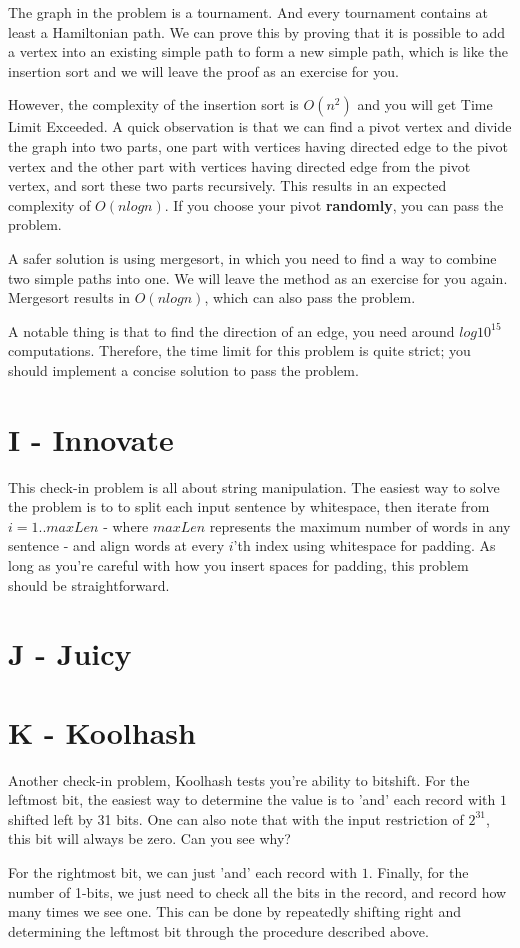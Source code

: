 \documentclass{article}
\begin{document}
The graph in the problem is a tournament. And every tournament contains at least a Hamiltonian path. We can prove this by proving that it is possible to add a vertex into an existing simple path to form a new simple path, which is like the insertion sort and we will leave the proof as an exercise for you.

\par
However, the complexity of the insertion sort is $O(n^2)$ and you will get Time Limit Exceeded. A quick observation is that we can find a pivot vertex and divide the graph into two parts, one part with vertices having directed edge to the pivot vertex and the other part with vertices having directed edge from the pivot vertex, and sort these two parts recursively. This results in an expected complexity of $O(nlogn)$. If you choose your pivot \textbf{randomly}, you can pass the problem.

\par
A safer solution is using mergesort, in which you need to find a way to combine two simple paths into one. We will leave the method as an exercise for you again. Mergesort results in $O(nlogn)$, which can also pass the problem.

\par
A notable thing is that to find the direction of an edge, you need around $log10^{15}$ computations. Therefore, the time limit for this problem is quite strict; you should implement a concise solution to pass the problem.

\section*{I - Innovate}
This check-in problem is all about string manipulation. The easiest way to solve the problem is to to split each input sentence by whitespace, then iterate from $i=1..maxLen$ - where $maxLen$ represents the maximum number of words in any sentence - and align words at every $i$'th index using whitespace for padding. As long as you're careful with how you insert spaces for padding, this problem should be straightforward.

\section*{J - Juicy}

\section*{K - Koolhash}
Another check-in problem, Koolhash tests you're ability to bitshift. For the leftmost bit, the easiest way to determine the value is to 'and' each record with $1$ shifted left by 31 bits. One can also note that with the input restriction of $2^{31}$, this bit will always be zero. Can you see why?

\par
For the rightmost bit, we can just 'and' each record with $1$. Finally, for the number of 1-bits, we just need to check all the bits in the record, and record how many times we see one. This can be done by repeatedly shifting right and determining the leftmost bit through the procedure described above.
\end{document}
